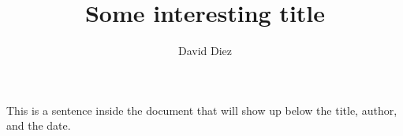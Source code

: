 \documentclass[11pt]{article}
\title{Some interesting title}
\author{David Diez}
\begin{document}
\maketitle

This is a sentence inside the document that will show up below the title, author, and the date.
\end{document}
